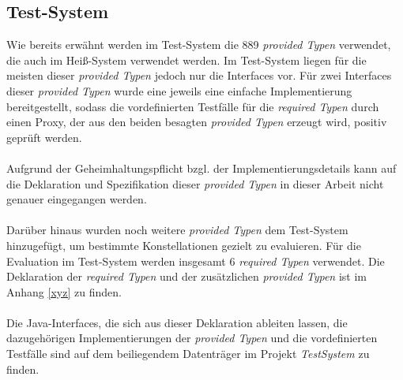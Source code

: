 \subsection{Test-System}\label{sec_testsystem}
Wie bereits erwähnt werden im Test-System die 889 \emph{provided Typen} verwendet, die auch im Heiß-System verwendet werden. Im Test-System liegen für die meisten dieser \emph{provided Typen} jedoch nur die Interfaces vor. Für zwei Interfaces dieser \emph{provided Typen} wurde eine jeweils eine einfache Implementierung bereitgestellt, sodass die vordefinierten Testfälle für die \emph{required Typen} durch einen Proxy, der aus den beiden besagten \emph{provided Typen} erzeugt wird, positiv geprüft werden.
\\\\
Aufgrund der Geheimhaltungspflicht bzgl. der Implementierungsdetails kann auf die Deklaration und Spezifikation dieser \emph{provided Typen} in dieser Arbeit nicht genauer eingegangen werden.
\\\\
Darüber hinaus wurden noch weitere \emph{provided Typen} dem Test-System hinzugefügt, um bestimmte Konstellationen gezielt zu evaluieren. Für die Evaluation im Test-System werden insgesamt 6 \emph{required Typen} verwendet. Die Deklaration der \emph{required Typen} und der zusätzlichen \emph{provided Typen} ist im Anhang \ref{xyz} zu finden.  
\\\\
Die Java-Interfaces, die sich aus dieser Deklaration ableiten lassen, die dazugehörigen Implementierungen der \emph{provided Typen} und die vordefinierten Testfälle sind auf dem beiliegendem Datenträger im Projekt \emph{TestSystem} zu finden.
%
%
%

